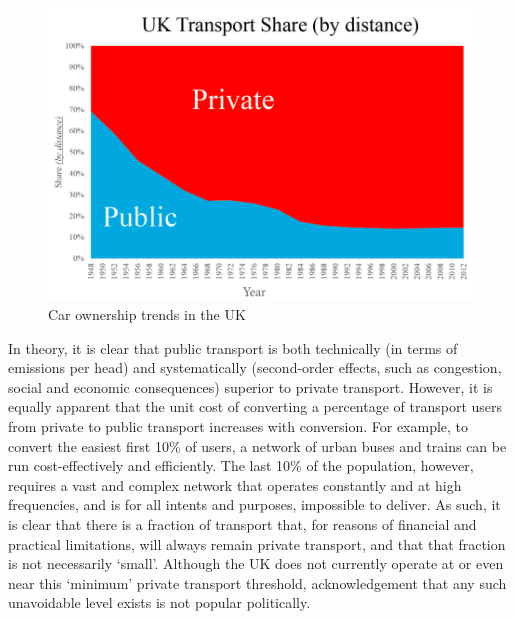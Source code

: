 \documentclass[journal]{IEEEtran}
\begin{document}
\begin{figure}[!htp]
\centering
\includegraphics[width=\columnwidth]{images/uktransportshare.png}
\caption{Car ownership trends in the UK}
\label{fig:uktransportshare}
\end{figure}


In theory, it is clear that public transport is both technically (in
terms of emissions per head) and systematically (second-order effects,
such as congestion, social and economic consequences) superior to
private transport. However, it is equally apparent that the unit cost
of converting a percentage of transport users from private to public
transport increases with conversion. For example, to convert the
easiest first 10\% of users, a network of urban buses and trains can
be run cost-effectively and efficiently. The last 10\% of the
population, however, requires a vast and complex network that operates
constantly and at high frequencies, and is for all intents and
purposes, impossible to deliver. As such, it is clear that there is a
fraction of transport that, for reasons of financial and practical
limitations, will always remain private transport, and that that
fraction is not necessarily `small'. Although the UK does not
currently operate at or even near this `minimum' private transport
threshold, acknowledgement that any such unavoidable level exists is
not popular politically.
\end{document}
